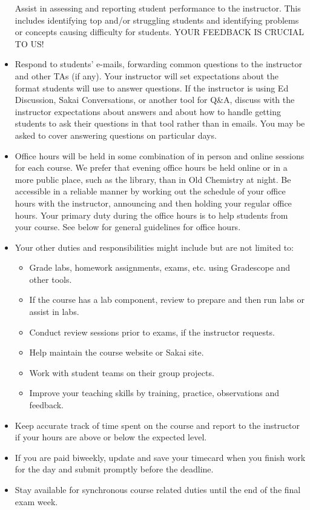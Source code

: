 \documentclass[
]{article}
\providecommand{\tightlist}{%
  \setlength{\itemsep}{0pt}\setlength{\parskip}{0pt}}
\begin{document}
\begin{itemize}
  Assist in assessing and reporting student performance to the instructor. This includes identifying top and/or struggling students and identifying problems or concepts causing difficulty for students. YOUR FEEDBACK IS CRUCIAL TO US!
\item
  Respond to students' e-mails, forwarding common questions to the instructor and other TAs (if any). Your instructor will set expectations about the format students will use to answer questions. If the instructor is using Ed Discussion, Sakai Conversations, or another tool for Q\&A, discuss with the instructor expectations about answers and about how to handle getting students to ask their questions in that tool rather than in emails. You may be asked to cover answering questions on particular days.
\item
  Office hours will be held in some combination of in person and online sessions for each course. We prefer that evening office hours be held online or in a more public place, such as the library, than in Old Chemistry at night. Be accessible in a reliable manner by working out the schedule of your office hours with the instructor, announcing and then holding your regular office hours. Your primary duty during the office hours is to help students from your course. See below for general guidelines for office hours.
\item
  Your other duties and responsibilities might include but are not limited to:

  \begin{itemize}
  \tightlist
  \item
    Grade labs, homework assignments, exams, etc. using Gradescope and other tools.
  \item
    If the course has a lab component, review to prepare and then run labs or assist in labs.
  \item
    Conduct review sessions prior to exams, if the instructor requests.
  \item
    Help maintain the course website or Sakai site.
  \item
    Work with student teams on their group projects.
  \item
    Improve your teaching skills by training, practice, observations and feedback.
  \end{itemize}
\item
  Keep accurate track of time spent on the course and report to the instructor if your hours are above or below the expected level.
\item
  If you are paid biweekly, update and save your timecard when you finish work for the day and submit promptly before the deadline.
\item
  Stay available for synchronous course related duties until the end of the final exam week.


\end{itemize}
\end{document}

